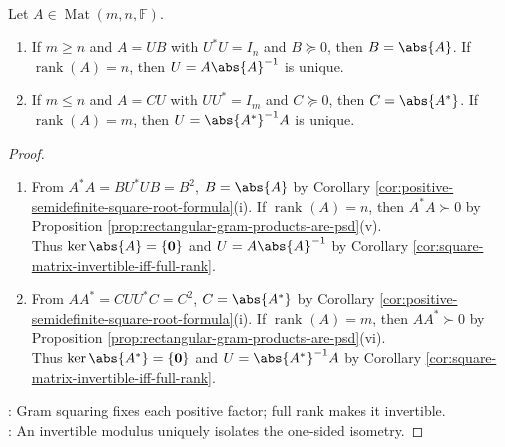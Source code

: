 \begin{theorem} \label{thm:polar-factor-uniqueness} \\
Let $A\in\operatorname{Mat}(m,n,\mathbb{F})$.
\begin{enumerate}[label=(\roman*)]
\setlength{\itemsep}{0pt}
\item If $m\geq n$ and $A=UB$ with $U^*U=I_n$ and $B\succeq0$, then $B=\abs{A}$. If $\operatorname{rank}(A)=n$, then $U=A\abs{A}^{-1}$ is unique.
\item If $m\leq n$ and $A=CU$ with $UU^*=I_m$ and $C\succeq0$, then $C=\abs{A^*}$. If $\operatorname{rank}(A)=m$, then $U=\abs{A^*}^{-1}A$ is unique.
\end{enumerate}
\begin{proof}
\begin{enumerate}[label=(\roman*)]
\setlength{\itemsep}{0pt}
\item From $A^*A=BU^*UB=B^2$, $B=\abs{A}$ by Corollary \ref{cor:positive-semidefinite-square-root-formula}(i). If $\operatorname{rank}(A)=n$, then $A^*A\succ0$ by Proposition \ref{prop:rectangular-gram-products-are-psd}(v).\\
Thus $\ker\abs{A}=\{\mathbf{0}\}$ and $U=A\abs{A}^{-1}$ by Corollary \ref{cor:square-matrix-invertible-iff-full-rank}.
\item From $AA^*=CUU^*C=C^2$, $C=\abs{A^*}$ by Corollary \ref{cor:positive-semidefinite-square-root-formula}(i). If $\operatorname{rank}(A)=m$, then $AA^*\succ0$ by Proposition \ref{prop:rectangular-gram-products-are-psd}(vi).\\
Thus $\ker\abs{A^*}=\{\mathbf{0}\}$ and $U=\abs{A^*}^{-1}A$ by Corollary \ref{cor:square-matrix-invertible-iff-full-rank}.
\end{enumerate}
: Gram squaring fixes each positive factor; full rank makes it invertible.\\
: An invertible modulus uniquely isolates the one-sided isometry.
\end{proof}
\end{theorem}

